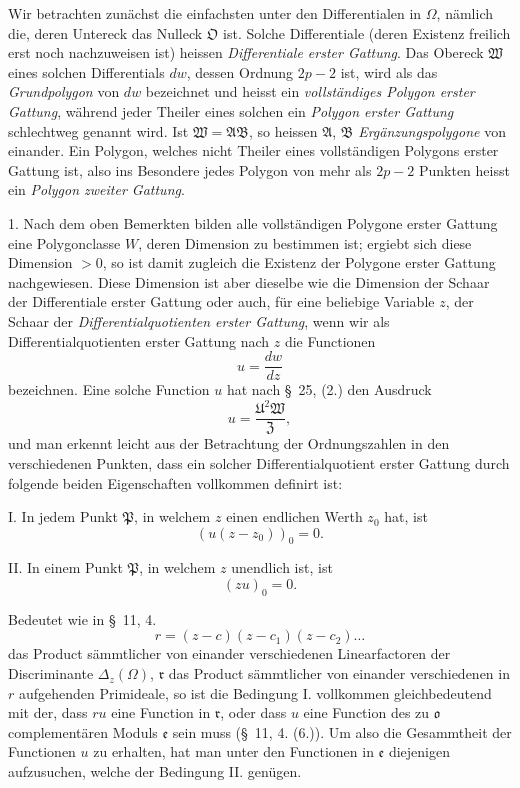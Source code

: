 \documentclass{article}
\begin{document}
Wir betrachten zunächst die einfachsten unter den Differentialen in $\Omega$, nämlich die, deren Untereck das Nulleck $\mathfrak{O}$ ist. Solche Differentiale (deren Existenz freilich erst noch nachzuweisen ist) heissen \emph{Differentiale erster Gattung}. Das Obereck $\mathfrak{W}$ eines solchen Differentials $dw$, dessen Ordnung $2p-2$ ist, wird als das \emph{Grundpolygon} von $dw$ bezeichnet und heisst ein \emph{vollständiges Polygon erster Gattung}, während jeder Theiler eines solchen ein \emph{Polygon erster Gattung} schlechtweg genannt wird. Ist $\mathfrak{W} = \mathfrak{A}\mathfrak{B}$, so heissen $\mathfrak{A}$, $\mathfrak{B}$ \emph{Ergänzungspolygone} von einander. Ein Polygon, welches nicht Theiler eines vollständigen Polygons erster Gattung ist, also ins Besondere jedes Polygon von mehr als $2p-2$ Punkten heisst ein \emph{Polygon zweiter Gattung}.

1. Nach dem oben Bemerkten bilden alle vollständigen Polygone erster Gattung eine Polygonclasse $W$, deren Dimension zu bestimmen ist; ergiebt sich diese Dimension $> 0$, so ist damit zugleich die Existenz der Polygone erster Gattung nachgewiesen. Diese Dimension ist aber dieselbe wie die Dimension der Schaar der Differentiale erster Gattung oder auch, für eine beliebige Variable $z$, der Schaar der \emph{Differentialquotienten erster Gattung}, wenn wir als Differentialquotienten erster Gattung nach $z$ die Functionen
\[ u = \frac{dw}{dz} \]
bezeichnen. Eine solche Function $u$ hat nach §~25, (2.) den Ausdruck
\[ u = \frac{\mathfrak{U}^{2}\mathfrak{W}}{\mathfrak{Z}}, \]
und man erkennt leicht aus der Betrachtung der Ordnungszahlen in den verschiedenen Punkten, dass ein solcher Differentialquotient erster Gattung durch folgende beiden Eigenschaften vollkommen definirt ist:

I. In jedem Punkt $\mathfrak{P}$, in welchem $z$ einen endlichen Werth $z_{0}$ hat, ist
\[ (u(z-z_{0}))_{0} = 0. \]


II. In einem Punkt $\mathfrak{P}$, in welchem $z$ unendlich ist, ist
\[ (zu)_{0} = 0. \]

Bedeutet wie in §~11, 4.
\[ r = (z-c)(z-c_{1})(z-c_{2})\ldots \]
das Product sämmtlicher von einander verschiedenen Linearfactoren der Discriminante $\Delta_{z}(\Omega)$, $\mathfrak{r}$ das Product sämmtlicher von einander verschiedenen in $r$ aufgehenden Primideale, so ist die Bedingung I. vollkommen gleichbedeutend mit der, dass $ru$ eine Function in $\mathfrak{r}$, oder dass $u$ eine Function des zu $\mathfrak{o}$ complementären Moduls $\mathfrak{e}$ sein muss (§~11, 4. (6.)). Um also die Gesammtheit der Functionen $u$ zu erhalten, hat man unter den Functionen in $\mathfrak{e}$ diejenigen aufzusuchen, welche der Bedingung II. genügen.
\end{document}

